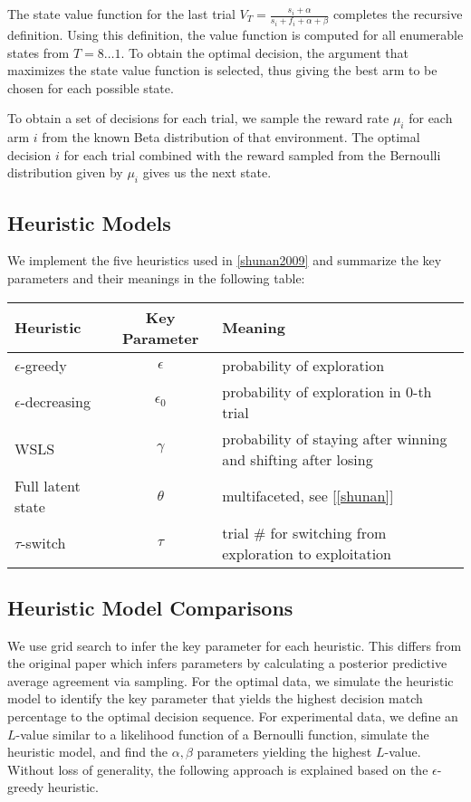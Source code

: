The state value function for the last trial $V_T=\frac{s_i + \alpha}{s_i + f_i + \alpha + \beta}$ completes the recursive definition. Using this definition, the value function is computed for all enumerable states from $T=8\ldots1$. To obtain the optimal decision, the argument that maximizes the state value function is selected, thus giving the best arm to be chosen for each possible state. 

To obtain a set of decisions for each trial, we sample the reward rate $\mu_i$ for each arm $i$ from the known Beta distribution of that environment. The optimal decision $i$ for each trial combined with the reward sampled from the Bernoulli distribution given by $\mu_i$ gives us the next state.

\subsection{Heuristic Models}
We implement the five heuristics used in \ref{shunan2009} and summarize the key parameters and their meanings in the following table: 

\begin{table}[h]
\begin{tabular}{|l|c|l|}
\hline
\textbf{Heuristic} & \textbf{Key Parameter} & \textbf{Meaning} \\ \hline
$\epsilon$-greedy & $\epsilon$ & probability of exploration \\ \hline
$\epsilon$-decreasing & $\epsilon_0$ & probability of exploration in 0-th trial \\ \hline
WSLS & $\gamma$ & probability of staying after winning and shifting after losing \\ \hline
Full latent state & $\theta$ & multifaceted, see [\ref{shunan}] \\ \hline
$\tau$-switch & $\tau$ & trial \# for switching from exploration to exploitation \\ \hline
\end{tabular}
\end{table}

\subsection{Heuristic Model Comparisons}
We use grid search to infer the key parameter for each heuristic. This differs from the original paper which infers parameters by calculating a posterior predictive average agreement via sampling. For the optimal data, we simulate the heuristic model to identify the key parameter that yields the highest decision match percentage to the optimal decision sequence. For experimental data, we define an $L$-value similar to a likelihood function of a Bernoulli function, simulate the heuristic model, and find the $\alpha,\beta$ parameters yielding the highest $L$-value. Without loss of generality, the following approach is explained based on the $\epsilon$-greedy heuristic. 

